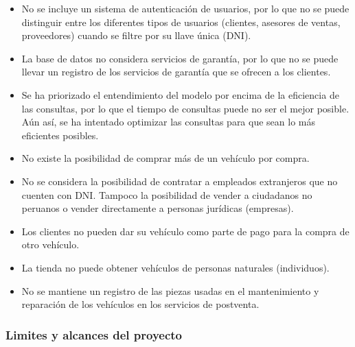 \documentclass[12pt]{article}
\begin{document}
\begin{itemize}

\item No se incluye un sistema de autenticación de usuarios, por lo que no se puede distinguir entre los diferentes tipos de usuarios (clientes, asesores de ventas, proveedores) cuando se filtre por su llave única (DNI).

\item La base de datos no considera servicios de garantía, por lo que no se puede llevar un registro de los servicios de garantía que se ofrecen a los clientes.

\item Se ha priorizado el entendimiento del modelo por encima de la eficiencia de las consultas, por lo que el tiempo de consultas puede no ser el mejor posible. Aún así, se ha intentado optimizar las consultas para que sean lo más eficientes posibles.

\item No existe la posibilidad de comprar más de un vehículo por compra.

\item No se considera la posibilidad de contratar a empleados extranjeros que no cuenten con DNI. Tampoco la posibilidad de vender a ciudadanos no peruanos o vender directamente a personas jurídicas (empresas).

\item Los clientes no pueden dar su vehículo como parte de pago para la compra de otro vehículo.

\item La tienda no puede obtener vehículos de personas naturales (individuos).

\item No se mantiene un registro de las piezas usadas en el mantenimiento y reparación de los vehículos en los servicios de postventa.

\end{itemize}


\subsubsection{Limites y alcances del proyecto}
\end{document}
